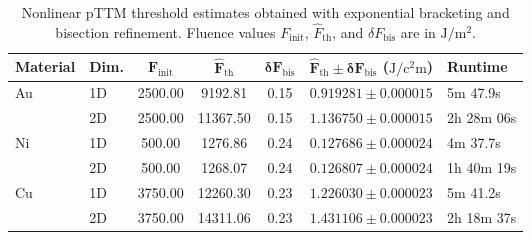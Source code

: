 \begin{table}[htbp]
    \centering
    \caption{
    Nonlinear pTTM threshold estimates obtained with exponential bracketing and bisection refinement.
    Fluence values \(F_{\mathrm{init}}\), \(\hat{F}_{\mathrm{th}}\), and \(\delta F_{\mathrm{bis}}\) are in \(\si{\joule\per\square\metre}\).
    }
    \label{tab:ch3-threshold-nonlinear}
    \begin{tabular}{@{}llccccl@{}}
        \toprule
        \rowcolor{gray!20}
        \textbf{Material}   & \textbf{Dim.} & \(\boldsymbol{F_{\mathrm{init}}}\) & \(\boldsymbol{\hat{F}_{\mathrm{th}}}\) & \(\boldsymbol{\delta F_{\mathrm{bis}}}\) & \(\boldsymbol{\hat{F}_{\mathrm{th}} \pm \delta F_{\mathrm{bis}}}\) (\(\si{\joule\per\square\centi\metre}\)) & \textbf{Runtime} \\
        \midrule
        \multirow{2}{*}{Au} & 1D            & 2500.00                            & 9192.81                                & 0.15                                     & \(0.919281 \pm 0.000015\)                                                                                   & 5m 47.9s         \\
                            & 2D            & 2500.00                            & 11367.50                               & 0.15                                     & \(1.136750 \pm 0.000015\)                                                                                   & 2h 28m 06s       \\
        \midrule
        \multirow{2}{*}{Ni} & 1D            & 500.00                             & 1276.86                                & 0.24                                     & \(0.127686 \pm 0.000024\)                                                                                   & 4m 37.7s         \\
                            & 2D            & 500.00                             & 1268.07                                & 0.24                                     & \(0.126807 \pm 0.000024\)                                                                                   & 1h 40m 19s       \\
        \midrule
        \multirow{2}{*}{Cu} & 1D            & 3750.00                            & 12260.30                               & 0.23                                     & \(1.226030 \pm 0.000023\)                                                                                   & 5m 41.2s         \\
                            & 2D            & 3750.00                            & 14311.06                               & 0.23                                     & \(1.431106 \pm 0.000023\)                                                                                   & 2h 18m 37s       \\
        \bottomrule
    \end{tabular}
\end{table}

